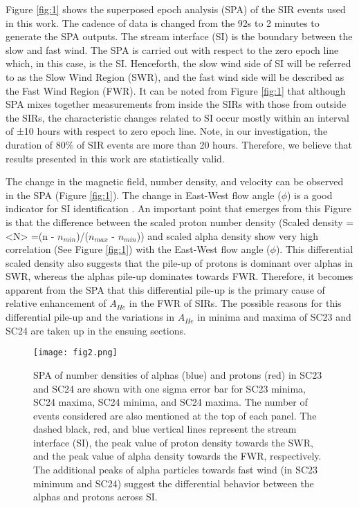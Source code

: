 \documentclass[letters,usenatbib]{mnras}
\begin{document}
Figure \ref{fig:1} shows the superposed epoch analysis (SPA) of the SIR events used in this work. The cadence of data is changed from the 92s to 2 minutes to generate the SPA outputs.  The stream interface (SI) is the boundary between the slow and fast wind. The SPA is carried out with respect to the zero epoch line which, in this case, is the SI. Henceforth, the slow wind side of SI will be referred to as the Slow Wind Region (SWR), and the fast wind side will be described as the Fast Wind Region (FWR). It can be noted from Figure \ref{fig:1} that although SPA mixes together measurements from inside the SIRs with those from outside the SIRs, the characteristic changes related to SI occur mostly within an interval of ±10 hours with respect to zero epoch line.  Note, in our investigation, the duration of 80\% of SIR events are more than 20 hours. Therefore, we believe that results presented in this work are statistically valid.


The change in the magnetic field, number density, and velocity can be observed in the SPA (Figure \ref{fig:1}). The change in East-West flow angle ($\phi$) is a good indicator for SI identification \citep{Mayank2022, Rout2017}. An important point that emerges from this Figure is that the difference between the scaled proton number density (Scaled density = <N> =(n - $n_{min}$)/($n_{max}$ - $n_{min}$)) and scaled alpha density show very high correlation (See Figure \ref{fig:1}) with the East-West flow angle ($\phi$). This differential scaled density also suggests that the pile-up of protons is dominant over alphas in SWR, whereas the alphas pile-up dominates towards FWR. Therefore, it becomes apparent from the SPA that this differential pile-up is the primary cause of relative enhancement of $A_{He}$ in the FWR of SIRs. The possible reasons for this differential pile-up and the variations in $A_{He}$ in minima and maxima of SC23 and SC24 are taken up in the ensuing sections. 

\begin{figure}
\begin{center}
\texttt{[image: fig2.png]}
\caption{SPA of number densities of alphas (blue) and protons (red) in SC23 and SC24 are shown with one sigma error bar for SC23 minima, SC24 maxima, SC24 minima, and SC24 maxima. The number of events considered are also mentioned at the top of each panel. The dashed black, red, and blue vertical lines represent the stream interface (SI), the peak value of proton density towards the SWR, and the peak value of alpha density towards the FWR, respectively. The additional peaks of alpha particles towards fast wind (in SC23 minimum and SC24) suggest the differential behavior between the alphas and protons across SI.     \label{fig:2}}

\end{center}
\end{figure}
\end{document}
